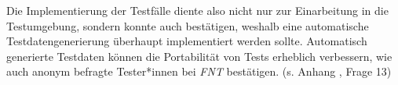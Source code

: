 Die Implementierung der Testfälle diente also nicht nur zur Einarbeitung in die Testumgebung, sondern konnte auch bestätigen, weshalb eine automatische Testdatengenerierung überhaupt implementiert werden sollte. Automatisch generierte Testdaten können die Portabilität von Tests erheblich verbessern, wie auch anonym befragte Tester*innen bei \textit{FNT} bestätigen. (s. Anhang , Frage 13)